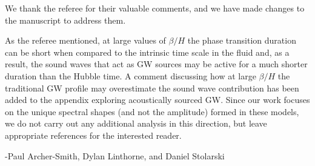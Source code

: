 \documentclass[12pt,letterpaper]{article}
\begin{document}
We thank the referee for their valuable comments, and we have made changes to the manuscript to address them. 

As the referee mentioned, at large values of $\beta/H$ the phase transition duration can be short when compared to the intrinsic time scale in the fluid and, as a result, the sound waves that act as GW sources may be active for a much shorter duration than the Hubble time. A comment discussing how at large $\beta/H$ the traditional GW profile may overestimate the sound wave contribution has been added to the appendix exploring acoustically sourced GW. Since our work focuses on the unique spectral shapes (and not the amplitude) formed in these models, we do not carry out any additional analysis in this direction, but leave appropriate references for the interested reader.

-Paul Archer-Smith, Dylan Linthorne, and Daniel Stolarski
\end{document}
